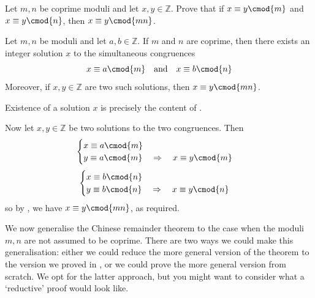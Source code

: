 \begin{exercise}
\label{exCRTUniqueness}
Let $m,n$ be coprime moduli and let $x,y \in \mathbb{Z}$. Prove that if $x \equiv y \cmod{m}$ and $x \equiv y \cmod{n}$, then $x \equiv y \cmod{mn}$.
\end{exercise}

\begin{theorem}
\label{thmChineseRemainder}
Let $m,n$ be moduli and let $a,b \in \mathbb{Z}$. If $m$ and $n$ are coprime, then there exists an integer solution $x$ to the simultaneous congruences
\[ x \equiv a \cmod{m} \quad \text{and} \quad x \equiv b \cmod{n} \]
Moreover, if $x,y \in \mathbb{Z}$ are two such solutions, then $x \equiv y \cmod{mn}$.
\end{theorem}
\begin{cproof}
Existence of a solution $x$ is precisely the content of .

Now let $x,y \in \mathbb{Z}$ be two solutions to the two congruences. Then
\[ \begin{cases} x \equiv a \cmod{m} \\ y \equiv a \cmod{m} \quad \Rightarrow \quad x \equiv y \cmod{m} \end{cases} \]
\[ \begin{cases} x \equiv b \cmod{n} \\ y \equiv b \cmod{n} \quad \Rightarrow \quad x \equiv y \cmod{n} \end{cases} \]
so by , we have $x \equiv y \cmod{mn}$, as required.
\end{cproof}

We now generalise the Chinese remainder theorem to the case when the moduli $m,n$ are not assumed to be coprime. There are two ways we could make this generalisation: either we could reduce the more general version of the theorem to the version we proved in , or we could prove the more general version from scratch. We opt for the latter approach, but you might want to consider what a `reductive' proof would look like.

